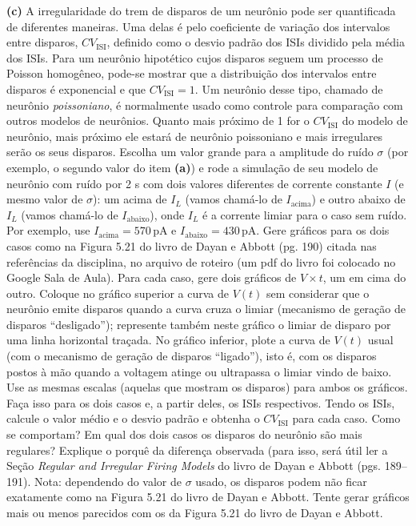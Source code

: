 \documentclass[english,11pt,a4paper]{article}
\begin{document}
	\noindent \textbf{(c)} A irregularidade do trem de disparos de um neurônio pode ser quantificada de diferentes maneiras. Uma delas é pelo coeficiente de variação dos intervalos entre disparos, $CV_{\text{ISI}}$, definido como o desvio padrão dos ISIs dividido pela média dos ISIs. Para um neurônio hipotético cujos disparos seguem um processo de Poisson homogêneo, pode-se mostrar que a distribuição dos intervalos entre disparos é exponencial e que $CV_{\text{ISI}} = 1$. Um neurônio desse tipo, chamado de neurônio \textit{poissoniano}, é normalmente usado como controle para comparação com outros modelos de neurônios. Quanto mais próximo de 1 for o $CV_{\text{ISI}}$ do modelo de neurônio, mais próximo ele estará de neurônio poissoniano e mais irregulares serão os seus disparos. Escolha um valor grande para a amplitude do ruído $\sigma$ (por exemplo, o segundo valor do item \textbf{(a)}) e rode a simulação de seu modelo de neurônio com ruído por 2 s com dois valores diferentes de corrente constante $I$ (e mesmo valor de $\sigma$): um acima de $I_L$ (vamos chamá-lo de $I_{\text{acima}}$) e outro abaixo de $I_L$ (vamos chamá-lo de $I_{\text{abaixo}}$), onde $I_L$ é a corrente limiar para o caso sem ruído. Por exemplo, use $I_{\text{acima}} = 570\,\text{pA}$ e $I_{\text{abaixo}} = 430\,\text{pA}$. Gere gráficos para os dois casos como na Figura 5.21 do livro de Dayan e Abbott (pg. 190) citada nas referências da disciplina, no arquivo de roteiro (um pdf do livro foi colocado no Google Sala de Aula). Para cada caso, gere dois gráficos de $V \times t$, um em cima do outro. Coloque no gráfico superior a curva de $V(t)$ sem considerar que o neurônio emite disparos quando a curva cruza o limiar (mecanismo de geração de disparos “desligado”); represente também neste gráfico o limiar de disparo por uma linha horizontal traçada. No gráfico inferior, plote a curva de $V(t)$ usual (com o mecanismo de geração de disparos “ligado”), isto é, com os disparos postos à mão quando a voltagem atinge ou ultrapassa o limiar vindo de baixo. Use as mesmas escalas (aquelas que mostram os disparos) para ambos os gráficos. Faça isso para os dois casos e, a partir deles, os ISIs respectivos. Tendo os ISIs, calcule o valor médio e o desvio padrão e obtenha o $CV_{\text{ISI}}$ para cada caso. Como se comportam? Em qual dos dois casos os disparos do neurônio são mais regulares? Explique o porquê da diferença observada (para isso, será útil ler a Seção \textit{Regular and Irregular Firing Models} do livro de Dayan e Abbott (pgs. 189–191). Nota: dependendo do valor de $\sigma$ usado, os disparos podem não ficar exatamente como na Figura 5.21 do livro de Dayan e Abbott. Tente gerar gráficos mais ou menos parecidos com os da Figura 5.21 do livro de Dayan e Abbott.
	\\
	
\end{document}
